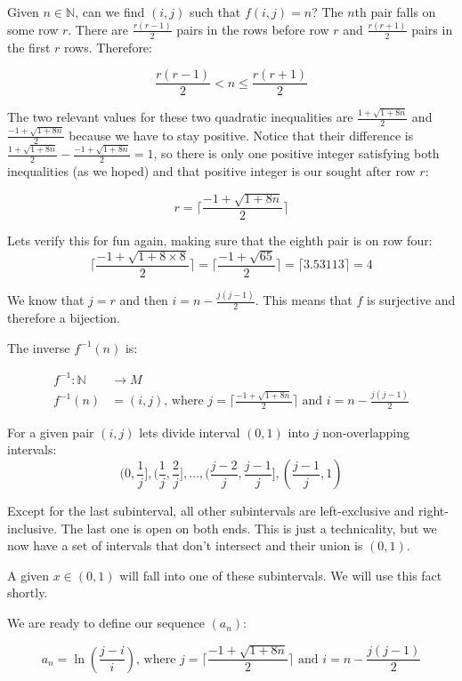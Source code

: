 \begin{solution}
Given $n \in \mathbb{N}$, can we find $(i, j)$ such that $f(i, j) = n$? The $n$th pair falls on some row $r$. There are $\frac{r (r - 1)}{2}$ pairs in the rows before row $r$ and $\frac{r (r + 1)}{2}$ pairs in the first $r$ rows. Therefore:

$$
\frac{r (r - 1)}{2} < n \leq \frac{r (r + 1)}{2}
$$

The two relevant values for these two quadratic inequalities are $\frac{1 + \sqrt{1 + 8 n}}{2}$ and $\frac{-1 + \sqrt{1 + 8 n}}{2}$ because we have to stay positive. Notice that their difference is $\frac{1 + \sqrt{1 + 8 n}}{2} - \frac{-1 + \sqrt{1 + 8 n}}{2} = 1$, so there is only one positive integer satisfying both inequalities (as we hoped) and that positive integer is our sought after row $r$:

$$
r = \bigg\lceil \frac{-1 + \sqrt{1 + 8 n}}{2} \bigg\rceil
$$

Lets verify this for fun again, making sure that the eighth pair is on row four: 
$$
\bigg\lceil \frac{-1 + \sqrt{1 + 8 \times 8}}{2} \bigg\rceil = \bigg\lceil \frac{-1 + \sqrt{65}}{2} \bigg\rceil = \lceil 3.53113 \rceil = 4
$$

We know that $j = r$ and then $i = n - \frac{j (j - 1)}{2}$. This means that $f$ is surjective and therefore a bijection.

The inverse $f^{-1}(n)$ is:

\begin{align*}
f^{-1}: \mathbb{N} &\to M \\
f^{-1}(n) &= (i, j) \text{, where } j = \bigg\lceil \frac{-1 + \sqrt{1 + 8 n}}{2} \bigg\rceil \text{ and } i = n - \frac{j (j - 1)}{2}
\end{align*}


For a given pair $(i, j)$ lets divide interval $(0, 1)$ into $j$ non-overlapping intervals: 
$$
(0, \frac{1}{j}], (\frac{1}{j}, \frac{2}{j}], \ldots, (\frac{j - 2}{j}, \frac{j - 1}{j}], (\frac{j-1}{j}, 1)
$$

Except for the last subinterval, all other subintervals are left-exclusive and right-inclusive. The last one is open on both ends. This is just a technicality, but we now have a set of intervals that don't intersect and their union is $(0, 1)$.

A given $x \in (0, 1)$ will fall into one of these subintervals. We will use this fact shortly.

We are ready to define our sequence $(a_n)$:

$$
a_n = \ln(\frac{j - i}{i}) \text{, where } j = \bigg\lceil \frac{-1 + \sqrt{1 + 8 n}}{2} \bigg\rceil \text{ and } i = n - \frac{j (j - 1)}{2}
$$


\end{solution}
